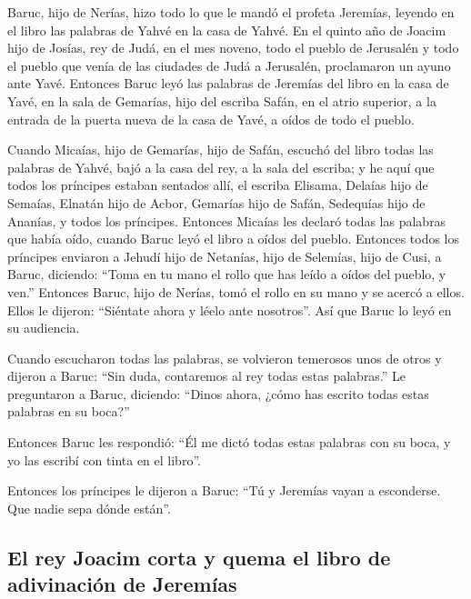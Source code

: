  Baruc, hijo de Nerías, hizo todo lo que le mandó el
profeta Jeremías, leyendo en el libro las palabras de Yahvé en la casa
de Yahvé.  En el quinto año de Joacim hijo de Josías, rey
de Judá, en el mes noveno, todo el pueblo de Jerusalén y todo el pueblo
que venía de las ciudades de Judá a Jerusalén, proclamaron un ayuno ante
Yavé.  Entonces Baruc leyó las palabras de Jeremías del
libro en la casa de Yavé, en la sala de Gemarías, hijo del escriba
Safán, en el atrio superior, a la entrada de la puerta nueva de la casa
de Yavé, a oídos de todo el pueblo.

 Cuando Micaías, hijo de Gemarías, hijo de Safán, escuchó
del libro todas las palabras de Yahvé,  bajó a la casa
del rey, a la sala del escriba; y he aquí que todos los príncipes
estaban sentados allí, el escriba Elisama, Delaías hijo de Semaías,
Elnatán hijo de Acbor, Gemarías hijo de Safán, Sedequías hijo de
Ananías, y todos los príncipes.  Entonces Micaías les
declaró todas las palabras que había oído, cuando Baruc leyó el libro a
oídos del pueblo.  Entonces todos los príncipes enviaron
a Jehudí hijo de Netanías, hijo de Selemías, hijo de Cusi, a Baruc,
diciendo: ``Toma en tu mano el rollo que has leído a oídos del pueblo, y
ven.'' Entonces Baruc, hijo de Nerías, tomó el rollo en su mano y se
acercó a ellos.  Ellos le dijeron: ``Siéntate ahora y
léelo ante nosotros''. Así que Baruc lo leyó en su audiencia.

 Cuando escucharon todas las palabras, se volvieron
temerosos unos de otros y dijeron a Baruc: ``Sin duda, contaremos al rey
todas estas palabras.''  Le preguntaron a Baruc,
diciendo: ``Dinos ahora, ¿cómo has escrito todas estas palabras en su
boca?''

 Entonces Baruc les respondió: ``Él me dictó todas estas
palabras con su boca, y yo las escribí con tinta en el libro''.

 Entonces los príncipes le dijeron a Baruc: ``Tú y
Jeremías vayan a esconderse. Que nadie sepa dónde están''.

\hypertarget{el-rey-joacim-corta-y-quema-el-libro-de-adivinaciuxf3n-de-jeremuxedas}{%
\subsection{El rey Joacim corta y quema el libro de adivinación de
Jeremías}\label{el-rey-joacim-corta-y-quema-el-libro-de-adivinaciuxf3n-de-jeremuxedas}}


